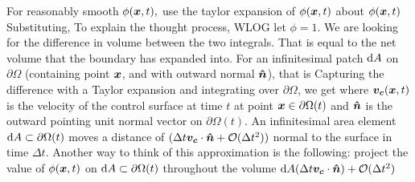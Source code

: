 For reasonably smooth  $\phi(\boldsymbol{x},t),$ use the taylor expansion of $\phi(\boldsymbol{x},t)$ about $\phi(\boldsymbol{x},t)$
Substituting,
To explain the thought process, WLOG let $\phi=1$. We are looking for the difference in volume between the two integrals. That is equal to the net volume that the boundary has expanded into. For an infinitesimal patch $\mathrm{d} A$ on $\partial\Omega$ (containing point $\boldsymbol{x}$, and with outward normal $\boldsymbol{\hat{n}}$), that is
Capturing the difference with a Taylor expansion and integrating over $\partial\Omega$, we get
where $\boldsymbol{v_c}(\boldsymbol{x},t)$ is the velocity of the control surface at time $t$ at point $\boldsymbol{x}\in\partial\Omega(t)$ and $\boldsymbol{\hat{n}}$ is the outward pointing unit normal vector on $\partial\Omega(t)$. An infinitesimal area element $\mathrm{d} A\subset\partial\Omega(t)$ moves a distance of $(\Delta t\boldsymbol{v_c}\cdot\boldsymbol{\hat{n}}+\mathcal{O}(\Delta t^2))$ normal to the surface in time $\Delta t.$ Another way to think of this approximation is the following: project the value of $\phi(\boldsymbol{x},t)$ on $\mathrm{d} A\subset\partial\Omega(t)$ throughout the volume $\mathrm{d} A(\Delta t\boldsymbol{v_c}\cdot\boldsymbol{\hat{n}})+\mathcal{O}(\Delta t^2)$
